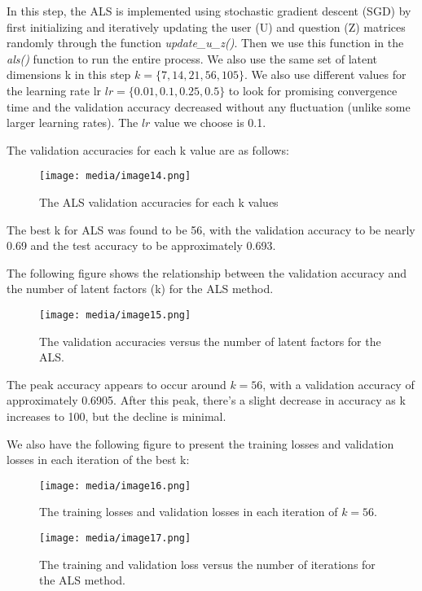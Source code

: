 \documentclass{article}
\begin{document}
In this step, the ALS is implemented using stochastic gradient descent (SGD) by first initializing and iteratively updating the user (U) and question (Z) matrices randomly through the function \textit{update\_u\_z()}. Then we use this function in the \textit{als()} function to run the entire process. We also use the same set of latent dimensions k in this step $k = \{7, 14, 21, 56, 105\}$. We also use different values for the learning rate lr $lr = \{0.01, 0.1, 0.25, 0.5\}$ to look for promising convergence time and the validation accuracy decreased without any fluctuation (unlike some larger learning rates). The $lr$ value we choose is 0.1.

The validation accuracies for each k value are as follows:

\begin{figure}[htbp]
\centering
\texttt{[image: media/image14.png]}
\caption{The ALS validation accuracies for each k values}
\end{figure}

The best k for ALS was found to be 56, with the validation accuracy to be nearly 0.69 and the test accuracy to be approximately 0.693.

The following figure shows the relationship between the validation accuracy and the number of latent factors (k) for the ALS method.

\begin{figure}[htbp]
\centering
\texttt{[image: media/image15.png]}
\caption{The validation accuracies versus the number of latent factors for the ALS.}
\end{figure}

The peak accuracy appears to occur around $k = 56$, with a validation accuracy of approximately 0.6905. After this peak, there's a slight decrease in accuracy as k increases to 100, but the decline is minimal.

We also have the following figure to present the training losses and validation losses in each iteration of the best k:

\begin{figure}[htbp]
\centering
\texttt{[image: media/image16.png]}
\caption{The training losses and validation losses in each iteration of $k = 56$.}
\end{figure}

\begin{figure}[htbp]
\centering
\texttt{[image: media/image17.png]}
\caption{The training and validation loss versus the number of iterations for the ALS method.}
\end{figure}
\end{document}
